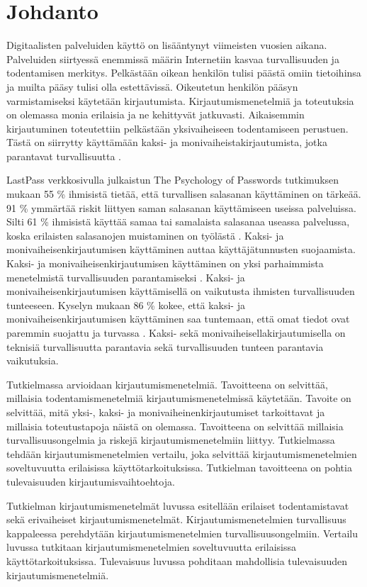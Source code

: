 \chapter{Johdanto\label{johdanto}}

Digitaalisten palveluiden käyttö on lisääntynyt viimeisten vuosien aikana. Palveluiden siirtyessä enemmissä määrin Internetiin kasvaa turvallisuuden ja todentamisen merkitys. Pelkästään oikean henkilön tulisi päästä omiin tietoihinsa ja muilta pääsy tulisi olla estettävissä. Oikeutetun henkilön pääsyn varmistamiseksi käytetään kirjautumista. Kirjautumismenetelmiä ja toteutuksia on olemassa monia erilaisia ja ne kehittyvät jatkuvasti. Aikaisemmin kirjautuminen toteutettiin pelkästään yksivaiheiseen todentamiseen perustuen. Tästä on siirrytty käyttämään kaksi- ja monivaiheistakirjautumista, jotka parantavat turvallisuutta \citep{cryptography2010001}.

LastPass verkkosivulla julkaistun The Psychology of Passwords tutkimuksen mukaan 55 \% ihmisistä tietää, että turvallisen salasanan käyttäminen on tärkeää. 91 \% ymmärtää riskit liittyen saman salasanan käyttämiseen useissa palveluissa. Silti 61 \% ihmisistä käyttää samaa tai samalaista salasanaa useassa palvelussa, koska erilaisten salasanojen muistaminen on työlästä \cite{lastpass}. Kaksi- ja monivaiheisenkirjautumisen käyttäminen auttaa käyttäjätunnusten suojaamista. Kaksi- ja monivaiheisenkirjautumisen käyttäminen on yksi parhaimmista menetelmistä turvallisuuden parantamiseksi \citep{top_security_practices}. Kaksi- ja monivaiheisenkirjautumisen käyttämisellä on vaikutusta ihmisten turvallisuuden tunteeseen. Kyselyn mukaan 86 \% kokee, että kaksi- ja monivaiheisenkirjautumisen käyttäminen saa tuntemaan, että omat tiedot ovat paremmin suojattu ja turvassa \citep{nist_2fa}. Kaksi- sekä monivaiheisellakirjautumisella on teknisiä turvallisuutta parantavia sekä turvallisuuden tunteen parantavia vaikutuksia.

Tutkielmassa arvioidaan kirjautumismenetelmiä. Tavoitteena on selvittää, millaisia todentamismenetelmiä kirjautumismenetelmissä käytetään. Tavoite on selvittää, mitä yksi-, kaksi- ja monivaiheinenkirjautumiset tarkoittavat ja millaisia toteutustapoja näistä on olemassa. Tavoitteena on selvittää millaisia turvallisuusongelmia ja riskejä kirjautumismenetelmiin liittyy. Tutkielmassa tehdään kirjautumismenetelmien vertailu, joka selvittää kirjautumismenetelmien soveltuvuutta erilaisissa käyttötarkoituksissa. Tutkielman tavoitteena on pohtia tulevaisuuden kirjautumisvaihtoehtoja.

Tutkielman kirjautumismenetelmät luvussa esitellään erilaiset todentamistavat sekä erivaiheiset kirjautumismenetelmät. Kirjautumismenetelmien turvallisuus kappaleessa perehdytään kirjautumismenetelmien turvallisuusongelmiin. Vertailu luvussa tutkitaan kirjautumismenetelmien soveltuvuutta erilaisissa käyttötarkoituksissa. Tulevaisuus luvussa pohditaan mahdollisia tulevaisuuden kirjautumismenetelmiä.


